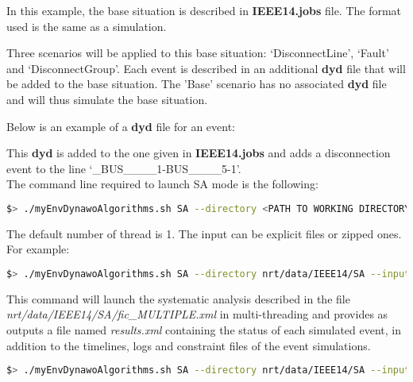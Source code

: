 \documentclass[a4paper, 12pt]{report}
\begin{document}


In this example, the base situation is described in \textbf{IEEE14.jobs} file. The format used is the same as a \Dynawo simulation.

Three scenarios will be applied to this base situation: `DisconnectLine', `Fault' and `DisconnectGroup'. 
Each event is described in an additional \textbf{dyd} file that will be added to the base situation. 
The 'Base' scenario has no associated \textbf{dyd} file and will thus simulate the base situation.

Below is an example of a \textbf{dyd} file for an event:



This \textbf{dyd} is added to the one given in \textbf{IEEE14.jobs} and adds a disconnection event to the line `\_BUS\_\_\_\_1-BUS\_\_\_\_5-1'.\\

The command line required to launch SA mode is the following:

\begin{lstlisting}[language=bash, breaklines=true, breakatwhitespace=false]
$> ./myEnvDynawoAlgorithms.sh SA --directory <PATH TO WORKING DIRECTORY> --input <NAME OF INPUT FILE> --output <NAME OF OUTPUT FILE> --nbThreads <NUMBER OF THREADS>
\end{lstlisting}

The default number of thread is 1. The input can be explicit files or zipped ones. For example:

\begin{lstlisting}[language=bash, breaklines=true, breakatwhitespace=false]
$> ./myEnvDynawoAlgorithms.sh SA --directory nrt/data/IEEE14/SA --input fic_MULTIPLE.xml --output results.xml --nbThreads 2
\end{lstlisting}

This command will launch the systematic analysis described in the file \textit{nrt/data/IEEE14/SA/fic\_MULTIPLE.xml} in multi-threading 
and provides as outputs a file named \textit{results.xml} containing the status of each simulated event, 
in addition to the timelines, logs and constraint files of the \Dynawo event simulations.\\

\begin{lstlisting}[language=bash, breaklines=true, breakatwhitespace=false]
$> ./myEnvDynawoAlgorithms.sh SA --directory nrt/data/IEEE14/SA --input inputs.zip --output outputs.zip
\end{lstlisting}
\end{document}
